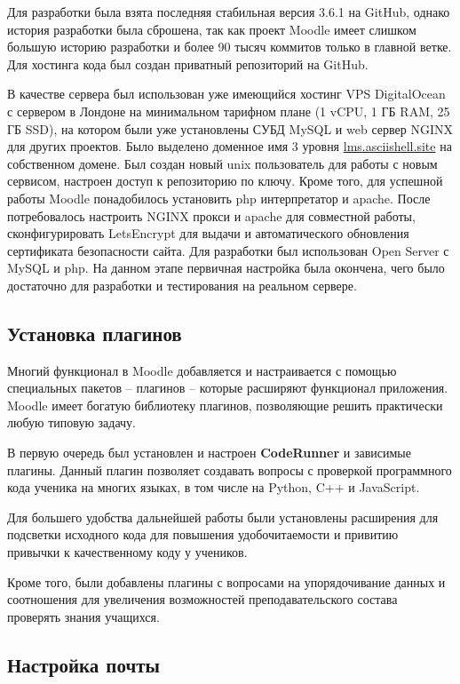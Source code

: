 \documentclass[a4paper,14pt]{article}
\begin{document}
Для разработки была взята последняя стабильная версия 3.6.1 на GitHub, однако история разработки была сброшена, так как проект Moodle имеет слишком большую историю разработки и более 90 тысяч коммитов только в главной ветке.
Для хостинга кода был создан приватный репозиторий на GitHub.

В качестве сервера был использован уже имеющийся хостинг VPS DigitalOcean с сервером в Лондоне на минимальном тарифном плане (1 vCPU, 1 ГБ RAM, 25 ГБ SSD), на котором были уже установлены СУБД MySQL и web сервер NGINX для других проектов.
Было выделено доменное имя 3 уровня \url{lms.asciishell.site} на собственном домене.
Был создан новый unix пользователь для работы с новым сервисом, настроен доступ к репозиторию по ключу.
Кроме того, для успешной работы Moodle понадобилось установить php интерпретатор и apache. 
После потребовалось настроить NGINX прокси и apache для совместной работы, сконфигурировать LetsEncrypt для выдачи и автоматического обновления сертификата безопасности сайта.
Для разработки был использован Open Server с MySQL и php.
На данном этапе первичная настройка была окончена, чего было достаточно для разработки и тестирования на реальном сервере.

\subsection{Установка плагинов}

Многий функционал в Moodle добавляется и настраивается с помощью специальных пакетов -- плагинов -- которые расширяют функционал приложения.
Moodle имеет богатую библиотеку плагинов, позволяющие решить практически любую типовую задачу.

В первую очередь был установлен и настроен \textbf{CodeRunner} и зависимые плагины.
Данный плагин позволяет создавать вопросы с проверкой программного кода ученика на многих языках, в том числе на Python, C++ и JavaScript.

Для большего удобства дальнейшей работы были установлены расширения для подсветки исходного кода для повышения удобочитаемости и привитию привычки к качественному коду у учеников.

Кроме того, были добавлены плагины с вопросами на упорядочивание данных и соотношения для увеличения возможностей преподавательского состава проверять знания учащихся.

\subsection{Настройка почты}
\end{document}
